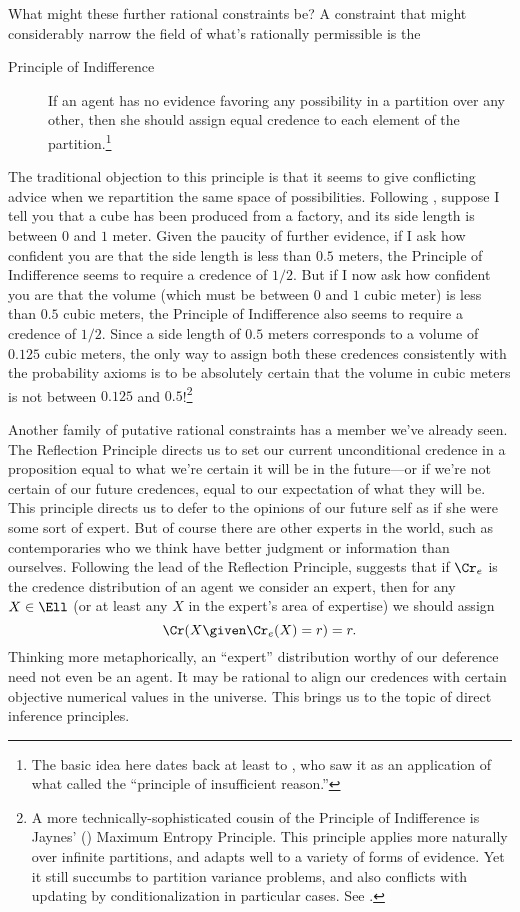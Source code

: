 What might these further rational constraints be? A constraint that might considerably narrow the field of what's rationally permissible is the 
\begin{description}
\item[Principle of Indifference]{If an agent has no evidence favoring any possibility in a partition over any other, then she should assign equal credence to each element of the partition.\footnote
{The basic idea here dates back at least to \citet{LaplaceEssay}, who saw it as an application of what \citet{BernoulliArs} called the ``principle of insufficient reason.''}}
\end{description}
The traditional objection to this principle is that it seems to give conflicting advice when we repartition the same space of possibilities. Following \citet{vanFraassenLaws}, suppose I tell you that a cube has been produced from a factory, and its side length is between $0$ and $1$ meter. Given the paucity of further evidence, if I ask how confident you are that the side length is less than $0.5$ meters, the Principle of Indifference seems to require a credence of $1/2$. But if I now ask how confident you are that the volume (which must be between $0$ and $1$ cubic meter) is less than $0.5$ cubic meters, the Principle of Indifference also seems to require a credence of $1/2$. Since a side length of $0.5$ meters corresponds to a volume of $0.125$ cubic meters, the only way to assign both these credences consistently with the probability axioms is to be absolutely certain that the volume in cubic meters is not between $0.125$ and $0.5$!\footnote
{A more technically-sophisticated cousin of the Principle of Indifference is Jaynes' (\citeyear{JaynesI,JaynesII}) Maximum Entropy Principle. This principle applies more naturally over infinite partitions, and adapts well to a variety of forms of evidence. Yet it still succumbs to partition variance problems, and also conflicts with updating by conditionalization in particular cases. See \citet{SeidenfeldEntropy}.}

Another family of putative rational constraints has a member we've already seen. The Reflection Principle directs us to set our current unconditional credence in a proposition equal to what we're certain it will be in the future---or if we're not certain of our future credences, equal to our expectation of what they will be. This principle directs us to defer to the opinions of our future self as if she were some sort of expert. But of course there are other experts in the world, such as contemporaries who we think have better judgment or information than ourselves. Following the lead of the Reflection Principle, \citet{ElgaReflection} suggests that if $\Cr_e$ is the credence distribution of an agent we consider an expert, then for any $X \in \Ell$ (or at least any $X$ in the expert's area of expertise) we should assign
\begin{equation}
\Cr(X \given \Cr_e(X)=r)=r. 
\end{equation}
Thinking more metaphorically, an ``expert'' distribution worthy of our deference need not even be an agent. It may be rational to align our credences with certain objective numerical values in the universe. This brings us to the topic of direct inference principles.


